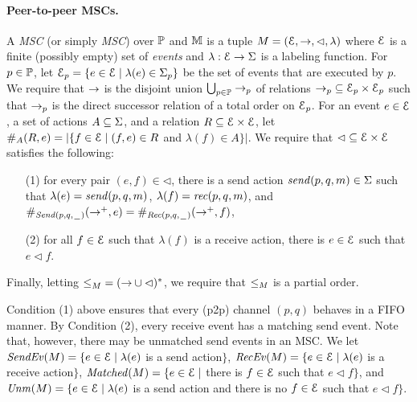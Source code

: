 \documentclass[a4paper,UKenglish,cleveref, autoref, thm-restate]{lipics-v2021}
\begin{document}
\paragraph*{Peer-to-peer MSCs.}
A \emph{\pp MSC} (or simply \emph{MSC}) over $\Procs$ and $\Msg$ is a tuple $\msc = (\Events,\procrel,\lhd,\lambda)$
where $\Events$ is a finite (possibly empty) set of \emph{events}
and $\lambda: \Events \to \Act$ is a labeling function.
For $p \in \Procs$, let $\Events_p = \{e \in \Events \mid \lambda(e) \in \pAct{p}\}$ be the set of events
that are executed by $p$.
We require that $\procrel$ is the disjoint union $\bigcup_{p \in \Procs} \procrel_p$
of relations ${\procrel_p} \subseteq \Events_p \times \Events_p$ such that
$\procrel_p$ is the direct successor relation of a total order on $\Events_p$.
For an event $e \in \Events$, a set of actions $A \subseteq \Act$, and a relation $\rel \subseteq \Events \times \Events$,
let $\sametype{e}{A}{\rel} = |\{f \in \Events \mid (f,e) \in \rel$ and $\lambda(f) \in A\}|$.
We require that ${\lhd} \subseteq \Events \times \Events$ satisfies the following:
\begin{itemize}\itemsep=0.5ex
\item[(1)] for every pair $(e,f) \in {\lhd}$, there is a send action $\sact{p}{q}{\msg} \in \Act$ such that
$\lambda(e) = \sact{p}{q}{\msg}$, $\lambda(f) = \ract{p}{q}{\msg}$, and
$\sametype{e}{\pqsAct{p}{q}}{\procrel^+} = \sametype{f}{\pqrAct{p}{q}}{\procrel^+}$,
\item[(2)] for all $f \in \Events$ such that $\lambda(f)$ is a receive action, there is $e \in \Events$ such that $e \lhd f$.
\end{itemize}
Finally, letting ${\le}_\msc = ({\procrel} \cup {\lhd})^\ast$,
we require that $\le_\msc$ is a partial order.

\medskip

Condition (1) above ensures that every (p2p) channel $(p,q)$ behaves in a FIFO manner.
By Condition (2), every receive event has a matching send event.
Note that, however, there may be unmatched send events in an MSC.
We let
$\SendEv{\msc} = \{e \in \Events \mid \lambda(e)$ is a send
action$\}$,
$\RecEv{\msc} = \{e \in \Events \mid \lambda(e)$ is a receive
action$\}$,
$\Matched{\msc} = \{e \in \Events \mid$ there is $f \in \Events$
such that $e \lhd f\}$, and
$\Unm{\msc} = \{e \in \Events \mid \lambda(e)$ is a send
action and there is no $f \in \Events$ such that $e \lhd f\}$.
\end{document}
